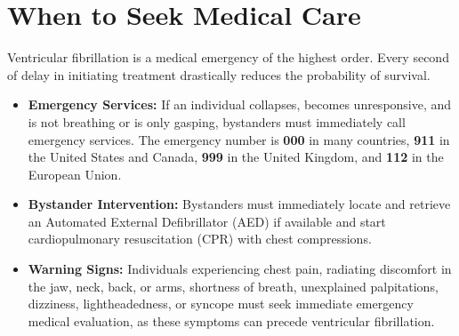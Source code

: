\section*{When to Seek Medical Care}
Ventricular fibrillation is a medical emergency of the highest order. Every second of delay in initiating treatment drastically reduces the probability of survival.
\begin{itemize}
    \item \textbf{Emergency Services:} If an individual collapses, becomes unresponsive, and is not breathing or is only gasping, bystanders must immediately call emergency services. The emergency number is \textbf{000} in many countries, \textbf{911} in the United States and Canada, \textbf{999} in the United Kingdom, and \textbf{112} in the European Union.
    \item \textbf{Bystander Intervention:} Bystanders must immediately locate and retrieve an Automated External Defibrillator (AED) if available and start cardiopulmonary resuscitation (CPR) with chest compressions.
    \item \textbf{Warning Signs:} Individuals experiencing chest pain, radiating discomfort in the jaw, neck, back, or arms, shortness of breath, unexplained palpitations, dizziness, lightheadedness, or syncope must seek immediate emergency medical evaluation, as these symptoms can precede ventricular fibrillation.
\end{itemize}

